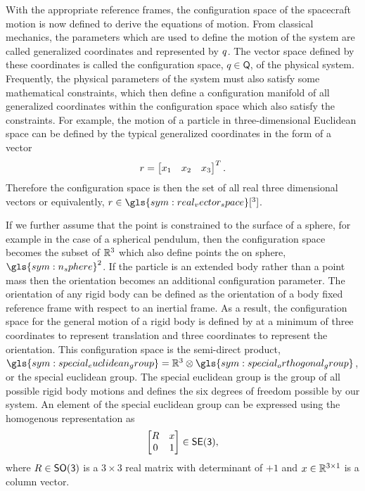 With the appropriate reference frames, the configuration space of the spacecraft motion is now defined to derive the equations of motion.
From classical mechanics, the parameters which are used to define the motion of the system are called generalized coordinates and represented by \( q \).
The vector space defined by these coordinates is called the configuration space, \( q \in \mathsf{Q} \), of the physical system.
Frequently, the physical parameters of the system must also satisfy some mathematical constraints, which then define a configuration manifold of all generalized coordinates within the configuration space which also satisfy the constraints.
For example, the motion of a particle in three-dimensional Euclidean space can be defined by the typical generalized coordinates in the form of a vector
\begin{align*}
    r = \begin{bmatrix}
        x_1 & x_2 & x_3
    \end{bmatrix}^T.
\end{align*}
Therefore the configuration space is then the set of all real three dimensional vectors or equivalently, \(\vc{r} \in \gls{sym:real_vector_space}[^3]\).

If we further assume that the point is constrained to the surface of a sphere, for example in the case of a spherical pendulum, then the configuration space becomes the subset of \( \mathbb{R}^3 \) which also define points the on sphere, \( \gls{sym:n_sphere}^2 \).
If the particle is an extended body rather than a point mass then the orientation becomes an additional configuration parameter.
The orientation of any rigid body can be defined as the orientation of a body fixed reference frame with respect to an inertial frame. 
As a result, the configuration space for the general motion of a rigid body is defined by at a minimum of three coordinates to represent translation and three coordinates to represent the orientation.
This configuration space is the semi-direct product, \( \gls{sym:special_euclidean_group} = \R^3 \otimes \gls{sym:special_orthogonal_group} \), or the special euclidean group.
The special euclidean group is the group of all possible rigid body motions and defines the six degrees of freedom possible by our system.
An element of the special euclidean group can be expressed using the homogenous representation as
\begin{align*}
    \begin{bmatrix}
        R & x \\
        0 & 1
    \end{bmatrix} \in \mathsf{SE(3)},
\end{align*}
where \( R \in \mathsf{SO(3)}\) is a \( 3 \times 3 \) real matrix with determinant of \( +1\) and \( x \in \mathbb{R}^{3 \times 1}\) is a column vector.


